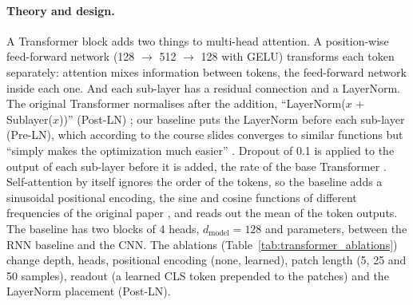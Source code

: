 \paragraph{Theory and design.} A Transformer block adds two things to multi-head attention. A
position-wise feed-forward network (128 $\rightarrow$ 512 $\rightarrow$ 128 with GELU) transforms each
token separately: attention mixes information between tokens, the feed-forward network inside each one.
And each sub-layer has a residual connection and a LayerNorm. The original Transformer normalises after
the addition, ``LayerNorm($x$ + Sublayer($x$))'' (Post-LN) \cite[p.~3]{vaswani2017attention}; our baseline puts
the LayerNorm before each sub-layer (Pre-LN), which according to the course slides converges to similar
functions but ``simply makes the optimization much easier'' \cite{course_transformer_part2}. Dropout
of 0.1 is applied to the output of each sub-layer before it is added, the rate of the base Transformer
\cite[p.~7]{vaswani2017attention}. Self-attention by itself ignores the order of the tokens, so the baseline
adds a sinusoidal positional encoding, the sine and cosine functions of different frequencies of the
original paper \cite[p.~6]{vaswani2017attention}, and reads out the mean of the token outputs. The baseline has
two blocks of 4 heads, $d_\text{model} = 128$ and \transformerParamsBase{} parameters, between the RNN
baseline and the CNN. The ablations (Table~\ref{tab:transformer_ablations}) change depth, heads,
positional encoding (none, learned), patch length (5, 25 and 50 samples), readout (a learned CLS token
prepended to the patches) and the LayerNorm placement (Post-LN).




